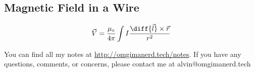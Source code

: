 \documentclass{math}
\begin{document}
\subsection*{Magnetic Field in a Wire}
\begin{center}
\end{center}
\[ \vec{V} = \frac{\mu_{\circ}}{4\pi}
  \int I\frac{\diff{\vec{l}}\times\vec{r}}{r^2} \]

\begin{center}
  You can find all my notes at \url{http://omgimanerd.tech/notes}. If you have
  any questions, comments, or concerns, please contact me at
  alvin@omgimanerd.tech
\end{center}
\end{document}
